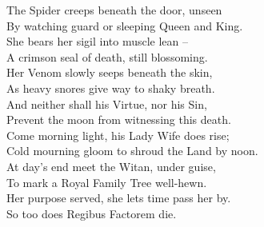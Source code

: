 \noindent The Spider creeps beneath the door, unseen\\
By watching guard or sleeping Queen and King.\\
She bears her sigil into muscle lean -- \\
A crimson seal of death, still blossoming.\\

\noindent Her Venom slowly seeps beneath the skin,\\
As heavy snores give way to shaky breath.\\
And neither shall his Virtue, nor his Sin,\\
Prevent the moon from witnessing this death.\\

\noindent Come morning light, his Lady Wife does rise;\\
Cold mourning gloom to shroud the Land by noon.\\
At day’s end meet the Witan, under guise,\\
To mark a Royal Family Tree well-hewn.\\

\noindent Her purpose served, she lets time pass her by.\\
So too does Regibus Factorem die.